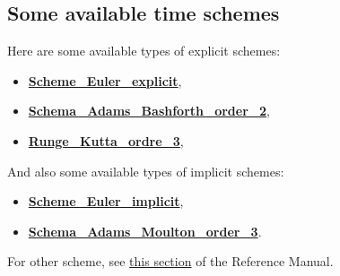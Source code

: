 \subsection{Some available time schemes}
Here are some available types of explicit schemes:
\begin{itemize}
\item \href{\REFERENCEMANUAL\#eulerscheme}{\textbf{Scheme\_Euler\_explicit}},
\item \href{\REFERENCEMANUAL\#schemaadamsbashforthorder2}{\textbf{Schema\_Adams\_Bashforth\_order\_2}},
\item \href{\REFERENCEMANUAL\#rungekuttaordre3}{\textbf{Runge\_Kutta\_ordre\_3}},
\end{itemize}

And also some available types of implicit schemes:
\begin{itemize}
\item \href{\REFERENCEMANUAL\#schemaeulerimplicite}{\textbf{Scheme\_Euler\_implicit}},
\item \href{\REFERENCEMANUAL\#schemaadamsmoultonorder3}{\textbf{Schema\_Adams\_Moulton\_order\_3}}.
\end{itemize}

For other scheme, see \href{\REFERENCEMANUAL\#schematempsbase}{this section} of the Reference Manual.\\

